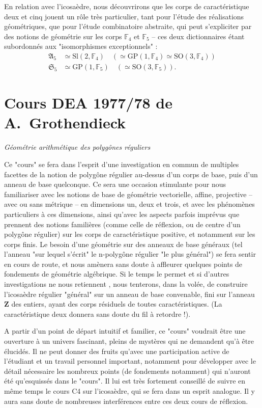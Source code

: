 \documentclass[11pt,a4paper]{article}
\begin{document}
En relation avec l'icosaèdre, nous découvrirons que les corps de
caractéristique deux et cinq jouent un rôle très particulier, tant pour l'étude
des réalisations géométriques, que pour l'étude combinatoire abstraite, qui
peut s'expliciter par des notions de géométrie sur les corps $\mathbb{F}_4$ et
$\mathbb{F}_5$ -- ces deux dictionnaires étant subordonnés aux "isomorphismes
exceptionnels" :
\begin{align*}
  \mathfrak{A}_5 &\simeq \mathrm{Sl}(2, \mathbb{F}_4) \quad
    (\simeq \mathrm{GP}(1, \mathbb{F}_4) \simeq \mathrm{SO}(3, \mathbb{F}_4)) \\
  \mathfrak{S}_5 &\simeq \mathrm{GP}(1, \mathbb{F}_5) \quad
    (\simeq \mathrm{SO}(3, \mathbb{F}_5)) .
\end{align*}

\section*{Cours DEA 1977/78 de A.~Grothendieck}

\textit{Géométrie arithmétique des polygônes réguliers}


Ce "cours" se fera dans l'esprit d'une investigation en commun de multiples
facettes de la notion de polygône régulier au-dessus d'un corps de base, puis
d'un anneau de base quelconque. Ce sera une occasion stimulante pour nous
familiariser avec les notions de base de géométrie vectorielle, affine,
projective -- avec ou sans métrique -- en dimensions un, deux et trois, et avec
les phénomènes particuliers à ces dimensions, ainsi qu'avec les aspects parfois
imprévus que prennent des notions familières (comme celle de réflexion, ou de
centre d'un polygône régulier) sur les corps de caractéristique positive, et
notamment sur les corps finis. Le besoin d'une géométrie sur des anneaux de
base généraux (tel l'anneau "sur lequel s'écrit" le n-polygône régulier "le
plus général") se fera sentir en cours de route, et nous amènera sans doute à
affleurer quelques points de fondements de géométrie algébrique. Si le temps le
permet et si d'autres investigations ne nous retiennent , nous tenterons, dans
la volée, de construire l'icosaèdre régulier "général" sur un anneau de base
convenable, fini sur l'anneau $\mathbf{Z}$ des entiers, ayant des corps
résiduels de toutes caractéristiques. (La caractéristique deux donnera sans
doute du fil à retordre !).

A partir d'un point de départ intuitif et familier, ce "cours" voudrait être
une ouverture à un univers fascinant, pleins de mystères qui ne demandent qu'à
être élucidés. Il ne peut donner des fruits qu'avec une participation active
de l'étudiant et un travail personnel important, notamment pour développer avec
le détail nécessaire les nombreux points (de fondements notamment) qui
n'auront été qu'esquissés dans le "cours". Il lui est très fortement conseillé
de suivre en même temps le cours C4 sur l'icosaèdre, qui se fera dans un esprit
analogue. Il y aura sans doute de nombreuses interférences entre ces deux cours
de réflexion.
\end{document}
